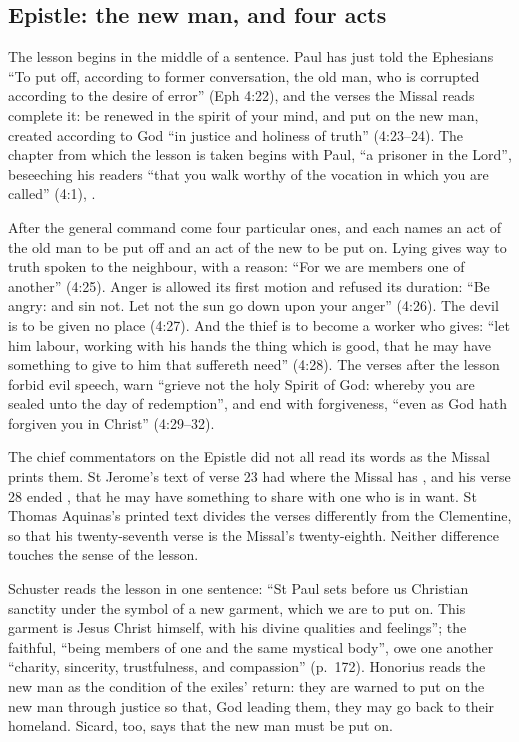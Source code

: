 \subsection{Epistle: the new man, and four acts}

The lesson begins in the middle of a sentence. Paul has just told the
Ephesians ``To put off, according to former conversation, the old man, who is
corrupted according to the desire of error'' (Eph 4:22), and the verses the
Missal reads complete it: be renewed in the spirit of your mind, and put on
the new man, created according to God ``in justice and holiness of truth''
(4:23--24). The chapter from which the lesson is taken begins with Paul, ``a
prisoner in the Lord'', beseeching his readers ``that you walk worthy of the
vocation in which you are called'' (4:1), .

After the general command come four particular ones, and each names an act of
the old man to be put off and an act of the new to be put on. Lying gives way
to truth spoken to the neighbour, with a reason: ``For we are members one of
another'' (4:25). Anger is allowed its first motion and refused its duration:
``Be angry: and sin not. Let not the sun go down upon your anger'' (4:26). The
devil is to be given no place (4:27). And the thief is to become a worker who
gives: ``let him labour, working with his hands the thing which is good, that
he may have something to give to him that suffereth need'' (4:28). The verses
after the lesson forbid evil speech, warn ``grieve not the holy Spirit of God:
whereby you are sealed unto the day of redemption'', and end with forgiveness,
``even as God hath forgiven you in Christ'' (4:29--32).

The chief commentators on the Epistle did not all read its words as the Missal
prints them. St Jerome's text of verse 23 had 
where the Missal has , and his verse 28 ended , that he may have something to share with one who
is in want. St Thomas Aquinas's printed text divides the verses differently
from the Clementine, so that his twenty-seventh verse is the Missal's
twenty-eighth. Neither difference touches the sense of the lesson.

Schuster reads the lesson in one sentence: ``St Paul sets before us Christian
sanctity under the symbol of a new garment, which we are to put on. This
garment is Jesus Christ himself, with his divine qualities and feelings''; the
faithful, ``being members of one and the same mystical body'', owe one another
``charity, sincerity, trustfulness, and compassion'' (p.~172). Honorius reads the
new man as the condition of the exiles' return: they are warned to put on the
new man through justice so that, God leading them, they may go back to their
homeland. Sicard, too, says that the new man must be put on.

